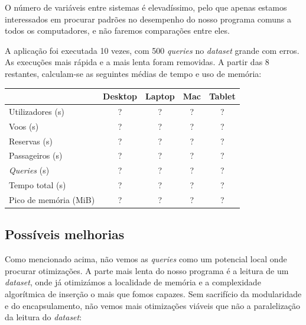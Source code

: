 \documentclass[11pt, a4paper]{article}
\begin{document}
O número de variáveis entre sistemas é elevadíssimo, pelo que apenas estamos interessados em
procurar padrões no desempenho do nosso programa comuns a todos os computadores, e não faremos
comparações entre eles.

A aplicação foi executada 10 vezes, com 500 \emph{queries} no \emph{dataset} grande com erros. As
execuções mais rápida e a mais lenta foram removidas. A partir das 8 restantes, calculam-se as
seguintes médias de tempo e uso de memória:

\begin{center}
    \begin{tabular}{|l|c|c|c|c|}
        \hline
        & Desktop & Laptop & Mac & Tablet \\
        \hline
        Utilizadores (s) & ? & ? & ? & ? \\
        \hline
        Voos (s) & ? & ? & ? & ? \\
        \hline
        Reservas (s) & ? & ? & ? & ? \\
        \hline
        Passageiros (s) & ? & ? & ? & ? \\
        \hline
        \emph{Queries} (s) & ? & ? & ? & ? \\
        \hline
        Tempo total (s) & ? & ? & ? & ? \\
        \hline
        Pico de memória (MiB) & ? & ? & ? & ? \\
        \hline
    \end{tabular}
\end{center}


\subsection{Possíveis melhorias}
\label{sec:possible-performance-improvements}

Como mencionado acima, não vemos as \emph{queries} como um potencial local onde procurar
otimizações. A parte mais lenta do nosso programa é a leitura de um \emph{dataset}, onde já
otimizámos a localidade de memória e a complexidade algorítmica de inserção o mais que fomos
capazes. Sem sacrifício da modularidade e do encapsulamento, não vemos mais otimizações viáveis
que não a paralelização da leitura do \emph{dataset}:
\end{document}
